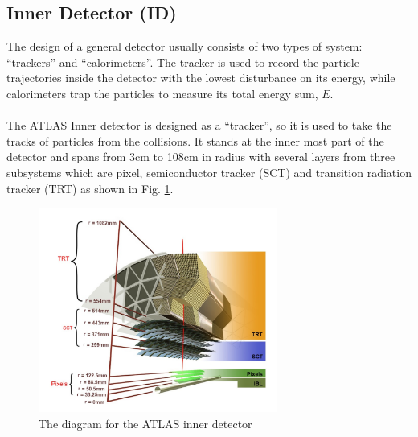 \subsection{Inner Detector (ID)}
The design of a general detector usually consists of two types of system: ``trackers'' and ``calorimeters''. The tracker is used to record the particle trajectories inside the detector with the lowest disturbance on its energy, while calorimeters trap the particles to measure its total energy sum, $E$. 
\\
\\The ATLAS Inner detector is designed as a ``tracker'', so it is used to take the tracks of particles from the collisions. It stands at the inner most part of the detector and spans from 3cm to 108cm in radius with several layers from three subsystems which are pixel, semiconductor tracker (SCT) and transition radiation tracker (TRT) as shown in Fig. \ref{Fig:ID}. 

\begin{figure}[!h]                
	\includegraphics[width=0.7\textwidth]{Chapter2/ID.png}
	\centering
	\begin{center}
		\caption{The diagram for the ATLAS inner detector}
		\label{Fig:ID}            
	\end{center}
\end{figure}

